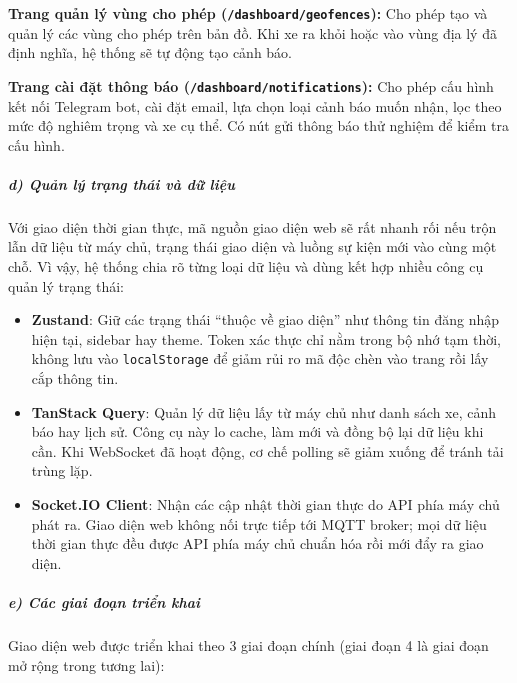 \documentclass[a4paper]{extarticle}
\providecommand{\tightlist}{%
  \setlength{\itemsep}{0pt}\setlength{\parskip}{0pt}}
\begin{document}
\textbf{Trang quản lý vùng cho phép (\texttt{/dashboard/geofences}):} Cho
phép tạo và quản lý các vùng cho phép trên bản đồ. Khi xe ra
khỏi hoặc vào vùng địa lý đã định nghĩa, hệ thống sẽ tự động tạo cảnh
báo.

\textbf{Trang cài đặt thông báo (\texttt{/dashboard/notifications}):}
Cho phép cấu hình kết nối Telegram bot, cài đặt email, lựa chọn loại
cảnh báo muốn nhận, lọc theo mức độ nghiêm trọng và xe cụ thể. Có nút
gửi thông báo thử nghiệm để kiểm tra cấu hình.

\subparagraph{d) Quản lý trạng thái và dữ
liệu}\label{d-quux1ea3n-luxfd-trux1ea1ng-thuxe1i-vuxe0-dux1eef-liux1ec7u}

Với giao diện thời gian thực, mã nguồn giao diện web sẽ rất nhanh rối nếu
trộn lẫn dữ liệu từ máy chủ, trạng thái giao diện và luồng sự kiện mới
vào cùng một chỗ. Vì vậy, hệ thống chia rõ từng loại dữ liệu và dùng kết
hợp nhiều công cụ quản lý trạng thái:

\begin{itemize}
\tightlist
\item
  \textbf{Zustand}: Giữ các trạng thái ``thuộc về giao diện'' như thông
  tin đăng nhập hiện tại, sidebar hay theme. Token xác thực chỉ nằm trong
  bộ nhớ tạm thời, không lưu vào \texttt{localStorage} để giảm rủi ro mã độc chèn
  vào trang rồi lấy cắp thông tin.
\item
  \textbf{TanStack Query}: Quản lý dữ liệu lấy từ máy chủ như danh sách
  xe, cảnh báo hay lịch sử. Công cụ này lo cache, làm mới và đồng bộ lại
  dữ liệu khi cần. Khi WebSocket đã hoạt động, cơ chế polling sẽ giảm
  xuống để tránh tải trùng lặp.
\item
  \textbf{Socket.IO Client}: Nhận các cập nhật thời gian thực do API phía máy chủ
  phát ra. Giao diện web không nối trực tiếp tới MQTT broker; mọi dữ liệu
  thời gian thực đều được API phía máy chủ chuẩn hóa rồi mới đẩy ra giao diện.
\end{itemize}

\subparagraph{e) Các giai đoạn triển
khai}\label{e-cuxe1c-giai-ux111oux1ea1n-triux1ec3n-khai}

Giao diện web được triển khai theo 3 giai đoạn chính (giai đoạn 4 là giai đoạn mở
rộng trong tương lai):
\end{document}
